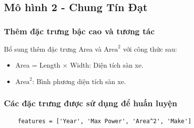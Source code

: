 \section{}
\section{}
\section{}
\subsection{Mô hình 2 - Chung Tín Đạt}
\subsubsection{Thêm đặc trưng bậc cao và tương tác}
Bổ sung thêm đặc trưng Area và $\text{Area}^2$ với công thức sau:
\begin{itemize}
    \item Area = Length $\times$ Width: Diện tích sàn xe.
    \item $\text{Area}^2$: Bình phương diện tích sàn xe.
\end{itemize}

\subsubsection{Các đặc trưng được sử dụng để huấn luyện}
\begin{lstlisting}
    features = ['Year', 'Max Power', 'Area^2', 'Make']
\end{lstlisting}

